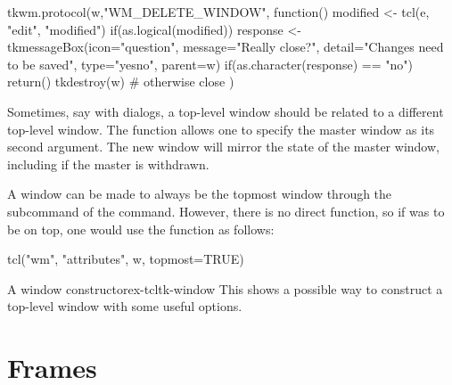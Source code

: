 \begin{Schunk}
\begin{Sinput}
 tkwm.protocol(w,"WM_DELETE_WINDOW", function() {
   modified <- tcl(e, "edit", "modified")
   if(as.logical(modified)) {
     response <- 
       tkmessageBox(icon="question",
                    message="Really close?",
                    detail="Changes need to be saved",
                    type="yesno",
                    parent=w)
     if(as.character(response) == "no")
       return()
   }
   tkdestroy(w)                          # otherwise close
 })
\end{Sinput}
\end{Schunk}

Sometimes, say with dialogs, a top-level window should be related to
a different top-level window. The function 
allows one to specify the master window as its second argument. The
new window will mirror the state of the master window, including if
the master is withdrawn.


A window can be made to always be the topmost window through the
 subcommand of the  command. However, there
is no direct  function, so if  was to be on top, one would use the 
function as follows: 
\begin{Schunk}
\begin{Sinput}
tcl("wm", "attributes", w, topmost=TRUE)  
\end{Sinput}
\end{Schunk}


\begin{example}{A window constructor}{ex-tcltk-window}
  This shows a possible way to construct a top-level window with some
  useful options.
\end{example}

\section{Frames}
\label{sec:tcltk:frames}

